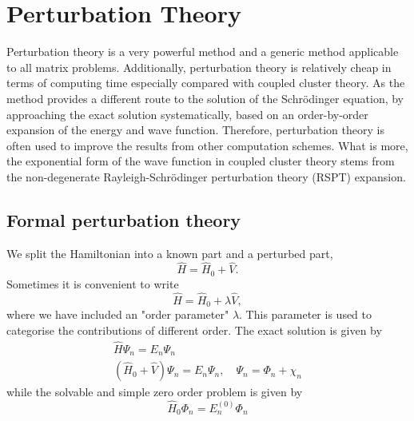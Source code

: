 \chapter{Perturbation Theory}

Perturbation theory is a very powerful method and a generic method applicable to all 
matrix problems. Additionally, perturbation theory is relatively cheap in terms of computing
time especially compared with coupled cluster theory. As the method provides a different 
route to the solution of the Schrödinger equation, by approaching the exact solution 
systematically, based on an order-by-order expansion of the energy and wave function. 
Therefore, perturbation theory is often used to improve the results from other computation 
schemes. What is more, the exponential form of the wave function in coupled cluster theory 
stems from the non-degenerate Rayleigh-Schrödinger perturbation theory (RSPT) expansion.

\section{Formal perturbation theory}

We split the Hamiltonian into a known part and a perturbed part,
\begin{equation}
    \hat{H} = \hat{H}_0 + \hat{V}.
\end{equation}
Sometimes it is convenient to write
\begin{equation}
    \label{eq:schrodinger_w_order_param}
    \hat{H} = \hat{H}_0 + \lambda\hat{V},
\end{equation}
where we have included an "order parameter" $\lambda$. This parameter is used to categorise
the contributions of different order. 
The exact solution is given by
\begin{equation}
    \label{eq:perturbation_schrodinger}
    \begin{gathered}
        \hat{H} \Psi_n = E_n \Psi_n \\
        (\hat{H}_0 + \hat{V}) \Psi_n = E_n \Psi_n, \quad \Psi_n = \Phi_n + \chi_n
    \end{gathered}
\end{equation}
while the solvable and simple zero order problem is given by
\begin{equation}
    \label{eq:zero_order_perturbed_schrodinger}
    \hat{H}_0 \Phi_n = E_n^{(0)} \Phi_n
\end{equation}

